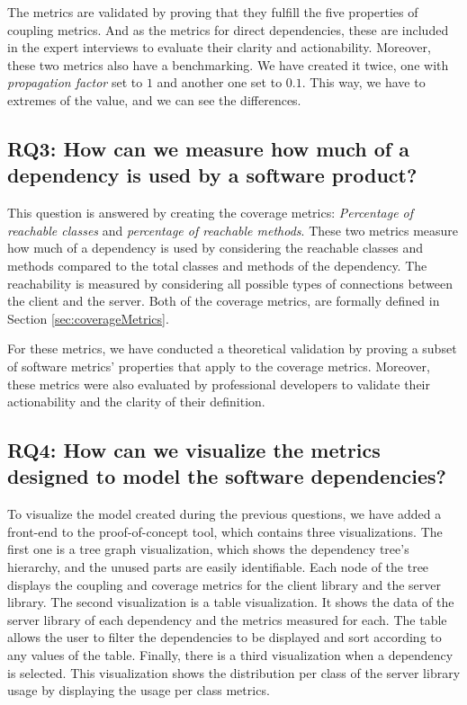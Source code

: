 The metrics are validated by proving that they fulfill the five properties of coupling metrics. And as the metrics for direct dependencies, these are included in the expert interviews to evaluate their clarity and actionability. Moreover, these two metrics also have a benchmarking. We have created it twice, one with \textit{propagation factor} set to $1$ and another one set to $0.1$. This way, we have to extremes of the value, and we can see the differences.

\subsection{RQ3: How can we measure how much of a dependency is used by a software product?}

This question is answered by creating the coverage metrics: \textit{Percentage of reachable classes} and \textit{percentage of reachable methods}. These two metrics measure how much of a dependency is used by considering the reachable classes and methods compared to the total classes and methods of the dependency. The reachability is measured by considering all possible types of connections between the client and the server. Both of the coverage metrics, are formally defined in Section \ref{sec:coverageMetrics}.

For these metrics, we have conducted a theoretical validation by proving a subset of software metrics' properties that apply to the coverage metrics. Moreover, these metrics were also evaluated by professional developers to validate their actionability and the clarity of their definition.


\subsection{RQ4: How can we visualize the metrics designed to model the software dependencies?}

To visualize the model created during the previous questions, we have added a front-end to the proof-of-concept tool, which contains three visualizations. The first one is a tree graph visualization, which shows the dependency tree's hierarchy, and the unused parts are easily identifiable. Each node of the tree displays the coupling and coverage metrics for the client library and the server library. The second visualization is a table visualization. It shows the data of the server library of each dependency and the metrics measured for each. The table allows the user to filter the dependencies to be displayed and sort according to any values of the table. Finally, there is a third visualization when a dependency is selected. This visualization shows the distribution per class of the server library usage by displaying the usage per class metrics.

